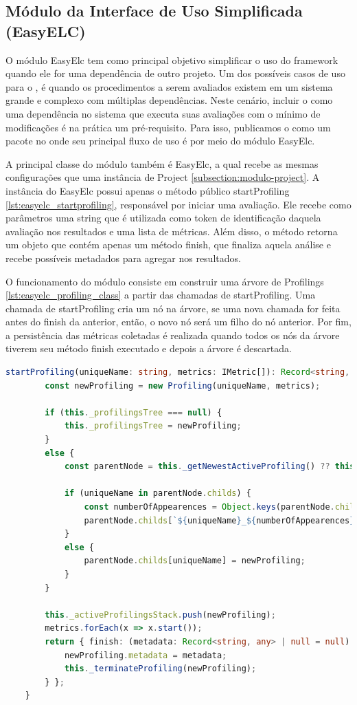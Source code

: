 \documentclass[12pt]{tcc}
\begin{document}
	\subsection{Módulo da Interface de Uso Simplificada (EasyELC)}
		\label{subsec:implemencao-easyelc}

	O módulo EasyElc tem como principal objetivo simplificar o uso do framework quando ele for uma dependência de outro projeto.
	Um dos possíveis casos de uso para o , é quando os procedimentos a serem avaliados existem em um sistema grande e complexo com múltiplas dependências.
	Neste cenário, incluir o  como uma dependência no sistema que executa suas avaliações com o mínimo de modificações é na prática um pré-requisito.
	Para isso, publicamos o  como um pacote no  onde seu principal fluxo de uso é por meio do módulo EasyElc.

	A principal classe do módulo também é EasyElc, a qual recebe as mesmas configurações que uma instância de Project \ref{subsection:modulo-project}.
	A instância do EasyElc possui apenas o método público startProfiling \ref{lst:easyelc_startprofiling}, responsável por iniciar uma avaliação.
	Ele recebe como parâmetros uma string que é utilizada como token de identificação daquela avaliação nos resultados e uma lista de métricas.
	Além disso, o método retorna um objeto que contém apenas um método finish, que finaliza aquela análise e recebe possíveis metadados para agregar nos resultados.

	O funcionamento do módulo consiste em construir uma árvore de Profilings \ref{lst:easyelc_profiling_class} a partir das chamadas de startProfiling.
	Uma chamada de startProfiling cria um nó na árvore, se uma nova chamada for feita antes do finish da anterior, então, o novo nó será um filho do nó anterior.
	Por fim, a persistência das métricas coletadas é realizada quando todos os nós da árvore tiverem seu método finish executado e depois a árvore é descartada.

	\begin{lstlisting}[label={lst:easyelc_startprofiling}, caption={Implementação do método startProfiling da classe EasyElc.}, language=TypeScript, breaklines=true]
	startProfiling(uniqueName: string, metrics: IMetric[]): Record<string, any> {
		const newProfiling = new Profiling(uniqueName, metrics);

		if (this._profilingsTree === null) {
			this._profilingsTree = newProfiling;
		}
		else {
			const parentNode = this._getNewestActiveProfiling() ?? this._profilingsTree;

			if (uniqueName in parentNode.childs) {
				const numberOfAppearences = Object.keys(parentNode.childs).filter(k => k.match(new RegExp(`^${uniqueName}(\$|_[0-9]{1,}\$`))).length
				parentNode.childs[`${uniqueName}_${numberOfAppearences}`] = newProfiling;
			}
			else {
				parentNode.childs[uniqueName] = newProfiling;
			}
		}
		
		this._activeProfilingsStack.push(newProfiling);
		metrics.forEach(x => x.start());
		return { finish: (metadata: Record<string, any> | null = null) => {
			newProfiling.metadata = metadata;
			this._terminateProfiling(newProfiling);
		} };
	}
	\end{lstlisting}
\end{document}
